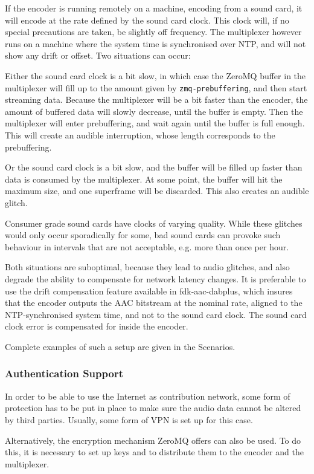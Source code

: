 If the encoder is running remotely on a machine, encoding from a sound card, it will encode at the
rate defined by the sound card clock. This clock will, if no special precautions are taken, be
slightly off frequency. The multiplexer however runs on a machine where the system time is
synchronised over NTP, and will not show any drift or offset. Two situations can occur:

Either the sound card clock is a bit slow, in which case the ZeroMQ buffer in the multiplexer will
fill up to the amount given by \texttt{zmq-prebuffering}, and then start streaming data. Because the
multiplexer will be a bit faster than the encoder, the amount of buffered data will slowly decrease,
until the buffer is empty. Then the multiplexer will enter prebuffering, and wait again until the
buffer is full enough. This will create an audible interruption, whose length corresponds to the
prebuffering.

Or the sound card clock is a bit slow, and the buffer will be filled up faster than data is consumed
by the multiplexer. At some point, the buffer will hit the maximum size, and one superframe will be
discarded. This also creates an audible glitch.

Consumer grade sound cards have clocks of varying quality. While these glitches would only occur
sporadically for some, bad sound cards can provoke such behaviour in intervals that are not
acceptable, e.g. more than once per hour.

Both situations are suboptimal, because they lead to audio glitches, and also degrade the ability to
compensate for network latency changes. It is preferable to use the drift compensation feature
available in fdk-aac-dabplus, which insures that the encoder outputs the AAC bitstream at the
nominal rate, aligned to the NTP-synchronised system time, and not to the sound card clock. The
sound card clock error is compensated for inside the encoder.

Complete examples of such a setup are given in the Scenarios.

\subsubsection{Authentication Support}
In order to be able to use the Internet as contribution network, some form of protection has to be
put in place to make sure the audio data cannot be altered by third parties. Usually, some form of
VPN is set up for this case.

Alternatively, the encryption mechanism ZeroMQ offers can also be used. To do this, it is necessary
to set up keys and to distribute them to the encoder and the multiplexer.

